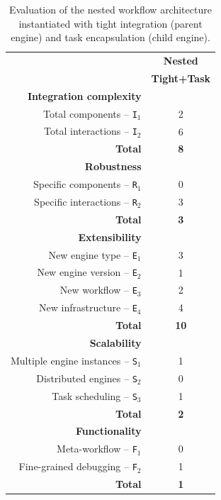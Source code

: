 \documentclass[preprint,3p,twocolumn]{elsarticle}
\newcommand{\correction}[1]{\color{blue}#1\color{black}\xspace}
\begin{document}
\begin{table}
\footnotesize
\centering
\begin{tabular}{rc}
                                     & \textbf{Nested}\\
                                     & \textbf{Tight+Task}\\
\cellcolor[HTML]{EEEEEE}\textbf{Integration complexity}&\cellcolor[HTML]{EEEEEE}\\
  Total components -- \texttt{I$_1$} & 2\\
Total interactions -- \texttt{I$_2$} & 6\\
\textbf{Total}& \textbf{8}\\
\cellcolor[HTML]{EEEEEE}\textbf{Robustness}&\cellcolor[HTML]{EEEEEE}\\
Specific components -- \texttt{R$_1$} & 0\\
  Specific interactions -- \texttt{R$_2$} & 3\\
  \textbf{Total}& \textbf{3}\\
\cellcolor[HTML]{EEEEEE}\textbf{Extensibility}&\cellcolor[HTML]{EEEEEE}\\
  New engine type -- \texttt{E$_1$}  & 3\\
New engine version -- \texttt{E$_2$} & 1\\
  New workflow -- \texttt{E$_3$}     & 2\\
New infrastructure -- \texttt{E$_4$} & 4\\
  \textbf{Total}& \textbf{10}\\
\cellcolor[HTML]{EEEEEE}\textbf{Scalability}& \cellcolor[HTML]{EEEEEE}\\
Multiple engine instances -- \texttt{S$_1$}& 1\\
Distributed engines -- \texttt{S$_2$}& 0\\
Task scheduling -- \texttt{S$_3$}    & 1\\
\textbf{Total}& \textbf{2}\\
\cellcolor[HTML]{EEEEEE}\textbf{\correction{Functionality}}&\cellcolor[HTML]{EEEEEE}\\
  Meta-workflow  -- \texttt{\correction{F}$_1$}    & 0\\
  Fine-grained debugging -- \texttt{\correction{F}$_2$}  & 1\\
  \textbf{Total}& \textbf{1}\\
\end{tabular}
\caption{\correction{Evaluation of the nested workflow architecture instantiated with tight integration (parent engine) and task encapsulation (child engine).}}
\label{table:evaluation-2}
\end{table}
\end{document}
